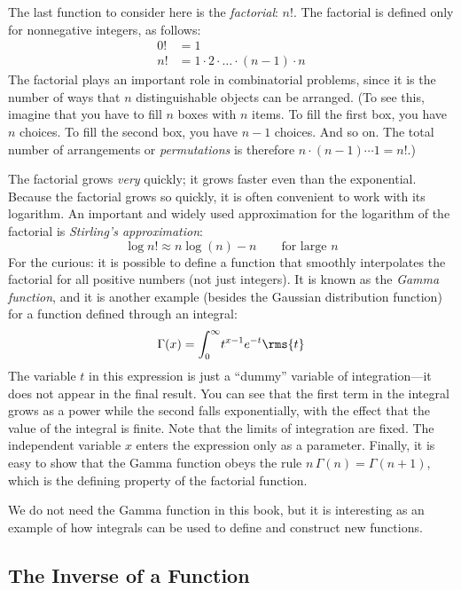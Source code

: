 The last function to consider here is the \emph{factorial}: $n!$. The
factorial is defined only for nonnegative integers, as follows:
%
\begin{align*}
  0! & = 1 \\
  n! & = 1 \cdot 2 \cdot \dots \cdot (n-1) \cdot n
\end{align*}
%
The factorial plays an important role in combinatorial problems, since
it is the number of ways that $n$ distinguishable objects can be
arranged. (To see this, imagine that you have to fill $n$ boxes with
$n$ items. To fill the first box, you have $n$ choices. To fill the
second box, you have $n-1$ choices. And so on. The total number of
arrangements or \emph{permutations} is therefore $n \cdot (n-1) \dotsb
1 = n!$.)

The factorial grows \emph{very} quickly; it grows faster even than the
exponential. Because the
factorial grows so quickly, it is often convenient to work with its
logarithm.  An important and widely used approximation for the
logarithm of the factorial is \emph{Stirling's approximation}:
%
\[
\log n! \approx n \log(n) - n \qquad \text{for large $n$}
\]
%
For the curious: it is possible to define a function that smoothly
interpolates the factorial for all positive numbers (not just
integers). It is known as the \emph{Gamma function}, and it is another
example (besides the Gaussian distribution function) for a function
defined through an integral:
%
\[
\Gamma(x) = \int_0^\infty \! t^{x-1} e^{-t} \rms{t}
\]
%
The variable $t$ in this expression is just a ``dummy'' variable of
integration---it does not appear in the final result. You can see
that the first term in the integral grows as a power while the
second falls exponentially, with the effect that the value of the
integral is finite. Note that the limits of integration are fixed. The
independent variable $x$ enters the expression only as a parameter.
Finally, it is easy to show that the Gamma function obeys the rule $n
\, \Gamma(n) = \Gamma(n+1)$, which is the defining property of the
factorial function.

We do not need the Gamma function in this book, but it is interesting
as an example of how integrals can be used to define and construct new
functions.

\subsection{The Inverse of a Function}

